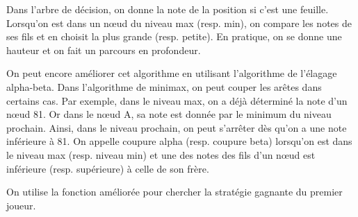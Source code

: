 \documentclass[12pt, a4paper]{article}
\begin{document}
Dans l'arbre de décision, on donne la note de la position si c'est une feuille. Lorsqu'on est dans un nœud du niveau max (resp. min), on compare les notes de ses fils et en choisit la plus grande (resp. petite). En pratique, on se donne une hauteur et on fait un parcours en profondeur.\par
On peut encore améliorer cet algorithme en utilisant l'algorithme de l'élagage alpha-beta. Dans l'algorithme de minimax, on peut couper les arêtes dans certains cas. Par exemple, dans le niveau max, on a déjà déterminé la note d'un nœud 81. Or dans le nœud A, sa note est donnée par le minimum du niveau prochain. Ainsi, dans le niveau prochain, on peut s'arrêter dès qu'on a une note inférieure à 81. On appelle coupure alpha (resp. coupure beta) lorsqu'on est dans le niveau max (resp. niveau min) et une des notes des fils d'un nœud est inférieure (resp. supérieure) à celle de son frère.
\begin{center}
    
\end{center}

On utilise la fonction améliorée pour chercher la stratégie gagnante du premier joueur.
\end{document}
